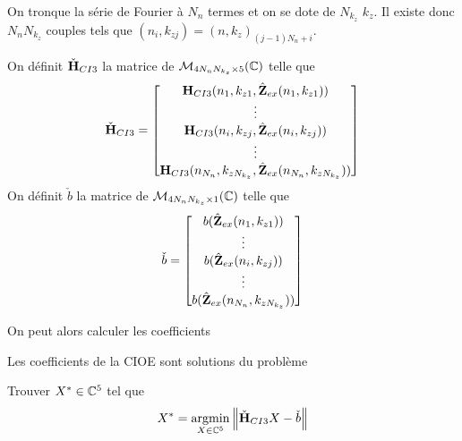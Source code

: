     On tronque la série de Fourier à \(N_{n}\) termes et on se dote de \(N_{k_z}\) \(k_z\). Il existe donc \(N_{n}N_{k_z}\) couples tels que \((n_i,k_{zj}) = (n,k_z)_{(j-1)N_{n}+i}\).
    \begin{defn}
      On définit \(\check{\mathbf{H}}_{CI3}\) la matrice de \(\mathcal{M}_{4N_{n}N_{k_z}\times5}(\mathbb C)\) telle que
      \begin{equation*}
        \check{\mathbf{H}}_{CI3} = 
        \begin{bmatrix}
          \mathbf{H}_{CI3}(n_1,k_{z1},\hat{\mathbf{Z}}_{ex}(n_1,k_{z1}))
          \\
          \vdots
          \\
          \mathbf{H}_{CI3}(n_i,k_{zj},\hat{\mathbf{Z}}_{ex}(n_i,k_{zj}))
          \\
          \vdots
          \\
          \mathbf{H}_{CI3}(n_{N_n},k_{zN_{k_z}},\hat{\mathbf{Z}}_{ex}(n_{N_n},k_{zN_{k_z}}))
        \end{bmatrix}
      \end{equation*}
      On définit \(\check{b}\) la matrice de \(\mathcal{M}_{4N_{n}N_{k_z}\times1}(\mathbb C)\) telle que
      \begin{equation*}
        \check{b} = 
        \begin{bmatrix}
          b(\hat{\mathbf{Z}}_{ex}(n_1,k_{z1}))
          \\
          \vdots
          \\
          b(\hat{\mathbf{Z}}_{ex}(n_i,k_{zj}))
          \\
          \vdots
          \\
          b(\hat{\mathbf{Z}}_{ex}(n_{N_n},k_{zN_{k_z}}))
        \end{bmatrix}
      \end{equation*}
    \end{defn}

    On peut alors calculer les coefficients

    \begin{thm}

      Les coefficients de la CIOE sont solutions du problème

      Trouver \(X^* \in \mathbb C^5\) tel que
      \begin{equation*}
        X^* = {\underset{X\in \mathbb C^5}{\operatorname{argmin}}} \left\lVert\check{\mathbf{H}}_{CI3}X - \check{b}\right\rVert
      \end{equation*}
    \end{thm}

